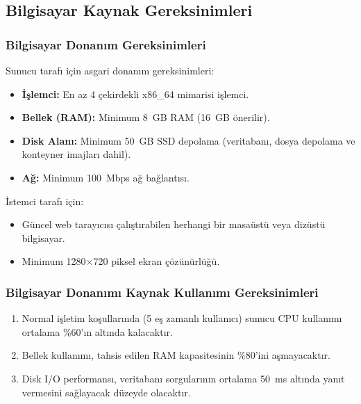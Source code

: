 \documentclass[12pt, a4paper]{article}
\begin{document}
\subsection{Bilgisayar Kaynak Gereksinimleri}

\subsubsection{Bilgisayar Donanım Gereksinimleri}

Sunucu tarafı için asgari donanım gereksinimleri:
\begin{itemize}[leftmargin=2cm]
    \item \textbf{İşlemci:} En az 4 çekirdekli x86\_64 mimarisi işlemci.
    \item \textbf{Bellek (RAM):} Minimum 8~GB RAM (16~GB önerilir).
    \item \textbf{Disk Alanı:} Minimum 50~GB SSD depolama (veritabanı, dosya depolama ve konteyner imajları dahil).
    \item \textbf{Ağ:} Minimum 100~Mbps ağ bağlantısı.
\end{itemize}

İstemci tarafı için:
\begin{itemize}[leftmargin=2cm]
    \item Güncel web tarayıcısı çalıştırabilen herhangi bir masaüstü veya dizüstü bilgisayar.
    \item Minimum 1280$\times$720 piksel ekran çözünürlüğü.
\end{itemize}

\subsubsection{Bilgisayar Donanımı Kaynak Kullanımı Gereksinimleri}

\begin{enumerate}[leftmargin=2cm]
    \item Normal işletim koşullarında (5 eş zamanlı kullanıcı) sunucu CPU kullanımı ortalama \%60'ın altında kalacaktır.
    \item Bellek kullanımı, tahsis edilen RAM kapasitesinin \%80'ini aşmayacaktır.
    \item Disk I/O performansı, veritabanı sorgularının ortalama 50~ms altında yanıt vermesini sağlayacak düzeyde olacaktır.
\end{enumerate}
\end{document}
